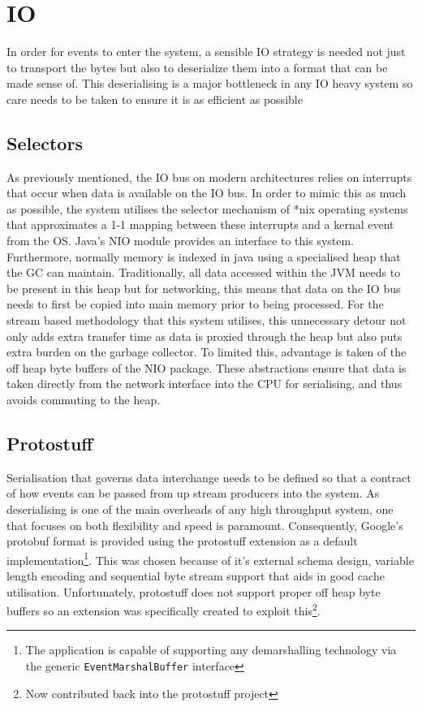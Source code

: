 \documentclass[a4paper,11pt]{scrreprt}
\begin{document}
\section{IO}
In order for events to enter the system, a sensible IO strategy is needed not just to transport the bytes but also to deserialize them into a format that can be made sense of. This deserialising is a major bottleneck in any IO heavy system so care needs to be taken to ensure it is as efficient as possible
\subsection{Selectors}
As previously mentioned, the IO bus on modern architectures relies on interrupts that occur when data is available on the IO bus. In order to mimic this as much as possible, the system utilises the selector mechanism of *nix operating systems that approximates a 1-1 mapping between these interrupts and a kernal event from the OS. Java's NIO module provides an interface to this system. Furthermore, normally memory is indexed in java using a specialised heap that the GC can maintain. Traditionally, all data accessed within the JVM needs to be present in this heap but for networking, this means that data on the IO bus needs to first be copied into main memory prior to being processed. For the stream based methodology that this system utilises, this unnecessary detour not only adds extra transfer time as data is proxied through the heap but also puts extra burden on the garbage collector.
To limited this, advantage is taken of the off heap byte buffers of the NIO package. These abstractions ensure that data is taken directly from the network interface into the CPU for serialising, and thus avoids commuting to the heap.
\subsection{Protostuff}
Serialisation that governs data interchange needs to be defined so that a contract of how events can be passed from up stream producers into the system. As deserialising is one of the main overheads of any high throughput system, one that focuses on both flexibility and speed is paramount. Consequently, Google's protobuf\cite{googleprotobuf} format is provided using the protostuff extension as a default implementation\footnote{The application is capable of supporting any demarshalling technology via the generic \texttt{EventMarshalBuffer} interface}. This was chosen because of it's external schema design, variable length encoding and sequential byte stream support that aids in good cache utilisation. Unfortunately, protostuff does not support proper off heap byte buffers so an extension was specifically created to exploit this\footnote{Now contributed back into the protostuff project}.
\end{document}
